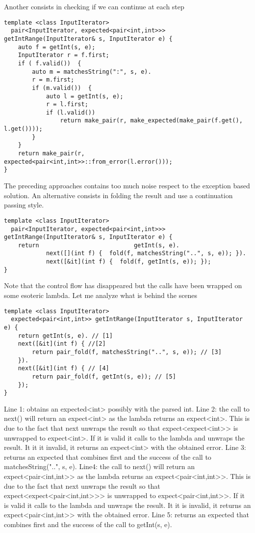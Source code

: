 \documentclass[a4paper,10pt]{article}
\begin{document}
Another consists in checking if we can continue at each step

\begin{lstlisting}
template <class InputIterator>
  pair<InputIterator, expected<pair<int,int>>> getIntRange(InputIterator& s, InputIterator e) {
    auto f = getInt(s, e);
    InputIterator r = f.first;
    if ( f.valid())  {
        auto m = matchesString(":", s, e).
        r = m.first;
        if (m.valid())  {
            auto l = getInt(s, e);
            r = l.first;
            if (l.valid())  
                return make_pair(r, make_expected(make_pair(f.get(), l.get())));
        }
    }        
    return make_pair(r, expected<pair<int,int>>::from_error(l.error()));
}
\end{lstlisting}

The preceding approaches contains too much noise respect to the exception based solution. An alternative consists in folding the result and use a continuation passing style. 

\begin{lstlisting}
template <class InputIterator>
  pair<InputIterator, expected<pair<int,int>>> getIntRange(InputIterator& s, InputIterator e) {
    return                           getInt(s, e). 
    		next([](int f) {  fold(f, matchesString("..", s, e)); }). 
    		next([&it](int f) {  fold(f, getInt(s, e)); });
}
\end{lstlisting}

Note that the control flow has disappeared but the calls have been wrapped on some esoteric lambda. Let me analyze what is behind the scenes

\begin{lstlisting}
template <class InputIterator>
  expected<pair<int,int>> getIntRange(InputIterator s, InputIterator e) {
    return getInt(s, e). // [1]
    next([&it](int f) { //[2]
        return pair_fold(f, matchesString("..", s, e)); // [3]
    }). 
    next([&it](int f) { // [4]
        return pair_fold(f, getInt(s, e)); // [5]
    });
}
\end{lstlisting}

Line 1: obtains an expected<int> possibly with the parsed int. 
Line 2: the call to next() will return an expect<int> as the lambda returns an expect<int>. This is due to the fact that next unwraps the result so that expect<expect<int>> is unwrapped to expect<int>. 
If it is valid it calls to the lambda and unwraps the result. It it it invalid, it returns an expect<int> with the obtained error.
Line 3: returns an expected that combines first and the success of the call to  matchesString("..", s, e).
Line4:  the call to next() will return an expect<pair<int,int>> as the lambda returns an expect<pair<int,int>>. This is due to the fact that next unwraps the result so that expect<expect<pair<int,int>>> is unwrapped to expect<pair<int,int>>. 
If it is valid it calls to the lambda and unwraps the result. It it is invalid, it returns an expect<pair<int,int>> with the obtained error.
Line 5: returns an expected that combines first and the success of the call to  getInt(s, e).
\end{document}
